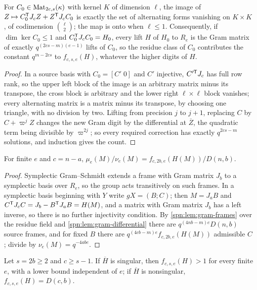 \begin{lemma}\label{spn:lem:gram-differential}
For $C_0\in\operatorname{Mat}_{2c,s}(\kappa)$ with kernel $K$ of dimension $\ell$, the image of
$Z\mapsto C_0^{\mathsf{T}}J_cZ+Z^{\mathsf{T}}J_cC_0$ is exactly the set of alternating forms vanishing on
$K\times K$, of codimension $\binom\ell2$; the map is onto when $\ell\le1$. Consequently, if
$\dim\ker C_0\le1$ and $C_0^{\mathsf{T}}J_cC_0=H_0$, every lift $H$ of $H_0$ to $R_e$ is the Gram matrix of
exactly $q^{(2cs-m)(e-1)}$ lifts of $C_0$, so the residue class of $C_0$ contributes the constant
$q^{m-2cs}$ to $f_{c,s,e}(H)$, whatever the higher digits of $H$.
\end{lemma}

\begin{proof}
In a source basis with $C_0=[C'\;0]$ and $C'$ injective, $C'^{\mathsf{T}}J_c$ has full row rank, so the
upper left block of the image is an arbitrary matrix minus its transpose, the cross block is arbitrary
and the lower right $\ell\times\ell$ block vanishes; every alternating matrix is a matrix minus its
transpose, by choosing one triangle, with no division by two. Lifting from precision $j$ to $j+1$,
replacing $C$ by $C+\varpi^jZ$ changes the new Gram digit by the differential at $\overline Z$, the
quadratic term being divisible by $\varpi^{2j}$; so every required correction has exactly
$q^{2cs-m}$ solutions, and induction gives the count.
\end{proof}

\begin{lemma}\label{spn:lem:padic-reduction}
For finite $e$ and $c=n-a$, $\mu_e(M)/\nu_e(M)=f_{c,2b,e}(H(M))/D(n,b)$.
\end{lemma}

\begin{proof}
Symplectic Gram--Schmidt extends a frame with Gram matrix $J_b$ to a symplectic basis over $R_e$, so
the group acts transitively on such frames. In a symplectic basis beginning with $Y$ write
$gX=(B;C)$; then $M=J_aB$ and $C^{\mathsf{T}}J_cC=J_b-B^{\mathsf{T}}J_aB=H(M)$, and a matrix with Gram
matrix $J_b$ has a left inverse, so there is no further injectivity condition. By
\cref{spn:lem:gram-frames} over the residue field and \cref{spn:lem:gram-differential} there are
$q^{(4nb-m)e}D(n,b)$ source frames, and for fixed $B$ there are $q^{(4cb-m)e}f_{c,2b,e}(H(M))$
admissible $C$; divide by $\nu_e(M)=q^{-4abe}$.
\end{proof}

\begin{proposition}\label{spn:prop:padic-sign}
Let $s=2b\ge2$ and $c\ge s-1$. If $\overline H$ is singular, then $f_{c,s,e}(H)>1$ for every finite
$e$, with a lower bound independent of $e$; if $\overline H$ is nonsingular, $f_{c,s,e}(H)=D(c,b)$.
\end{proposition}


